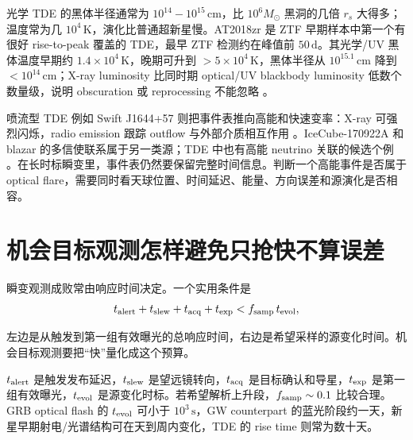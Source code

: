 光学 TDE 的黑体半径通常为 \(10^{14}-10^{15}\,\mathrm{cm}\)，比 \(10^6M_\odot\) 黑洞的几倍 \(r_s\) 大得多；温度常为几 \(10^4\,\mathrm{K}\)，演化比普通超新星慢。AT2018zr 是 ZTF 早期样本中第一个有很好 rise-to-peak 覆盖的 TDE，最早 ZTF 检测约在峰值前 \(50\,\mathrm{d}\)。其光学/UV 黑体温度早期约 \(1.4\times10^4\,\mathrm{K}\)，晚期可升到 \(>5\times10^4\,\mathrm{K}\)，黑体半径从 \(10^{15.1}\,\mathrm{cm}\) 降到 \(<10^{14}\,\mathrm{cm}\)；X-ray luminosity 比同时期 optical/UV blackbody luminosity 低数个数量级，说明 obscuration 或 reprocessing 不能忽略 \citep{2019ApJ...872..198V,2021ARA&A..59...21G}。

喷流型 TDE 例如 Swift J1644+57 则把事件表推向高能和快速变率：X-ray 可强烈闪烁，radio emission 跟踪 outflow 与外部介质相互作用 \citep{2011Sci...333..203B}。IceCube-170922A 和 blazar 的多信使联系属于另一类源；TDE 中也有高能 neutrino 关联的候选个例 \citep{2021NatAs...5..510S}。在长时标瞬变里，事件表仍然要保留完整时间信息。判断一个高能事件是否属于 optical flare，需要同时看天球位置、时间延迟、能量、方向误差和源演化是否相容。

\section{机会目标观测怎样避免只抢快不算误差}

瞬变观测成败常由响应时间决定。一个实用条件是
\begin{equation}
  t_{\rm alert}+t_{\rm slew}+t_{\rm acq}+t_{\rm exp}
  < f_{\rm samp}\,t_{\rm evol},
  \label{eq:ch13-response-budget}
\end{equation}
\begin{formulaexplain}
左边是从触发到第一组有效曝光的总响应时间，右边是希望采样的源变化时间。机会目标观测要把“快”量化成这个预算。
\end{formulaexplain}
\(t_{\rm alert}\) 是触发发布延迟，\(t_{\rm slew}\) 是望远镜转向，\(t_{\rm acq}\) 是目标确认和导星，\(t_{\rm exp}\) 是第一组有效曝光，\(t_{\rm evol}\) 是源变化时标。若希望解析上升段，\(f_{\rm samp}\sim0.1\) 比较合理。GRB optical flash 的 \(t_{\rm evol}\) 可小于 \(10^3\,\mathrm{s}\)，GW counterpart 的蓝光阶段约一天，新星早期射电/光谱结构可在天到周内变化，TDE 的 rise time 则常为数十天。

